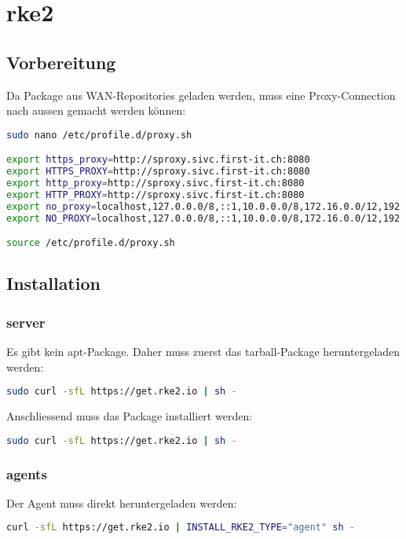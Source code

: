 
\section{rke2}
\subsection{Vorbereitung}
Da Package aus WAN-Repositories geladen werden, muss eine Proxy-Connection nach aussen gemacht werden können:
\lstset{style=gra_codestyle}
\begin{lstlisting}[language=bash, caption=Proxy Settings,captionpos=b,label={lst:proxy-settings},breaklines=true]
sudo nano /etc/profile.d/proxy.sh

export https_proxy=http://sproxy.sivc.first-it.ch:8080
export HTTPS_PROXY=http://sproxy.sivc.first-it.ch:8080
export http_proxy=http://sproxy.sivc.first-it.ch:8080
export HTTP_PROXY=http://sproxy.sivc.first-it.ch:8080
export no_proxy=localhost,127.0.0.0/8,::1,10.0.0.0/8,172.16.0.0/12,192.168.0.0/16
export NO_PROXY=localhost,127.0.0.0/8,::1,10.0.0.0/8,172.16.0.0/12,192.168.0.0/16

source /etc/profile.d/proxy.sh
\end{lstlisting}

\subsection{Installation}
\subsubsection{server}
Es gibt kein apt-Package.
Daher muss zuerst das tarball-Package heruntergeladen werden:
\lstset{style=gra_codestyle}
\begin{lstlisting}[language=bash, caption=Downlaod rke2 server,captionpos=b,label={lst:download-rke2-server},breaklines=true]
sudo curl -sfL https://get.rke2.io | sh -
\end{lstlisting}
Anschliessend muss das Package installiert werden:
\lstset{style=gra_codestyle}
\begin{lstlisting}[language=bash, caption=rke2 server installieren,captionpos=b,label={lst:install-rke2-server},breaklines=true]
sudo curl -sfL https://get.rke2.io | sh -
\end{lstlisting}

\subsubsection{agents}
Der Agent muss direkt heruntergeladen werden:
\lstset{style=gra_codestyle}
\begin{lstlisting}[language=bash, caption=Downlaod rke2 agent,captionpos=b,label={lst:download-rke2-agent},breaklines=true]
curl -sfL https://get.rke2.io | INSTALL_RKE2_TYPE="agent" sh -
\end{lstlisting}

